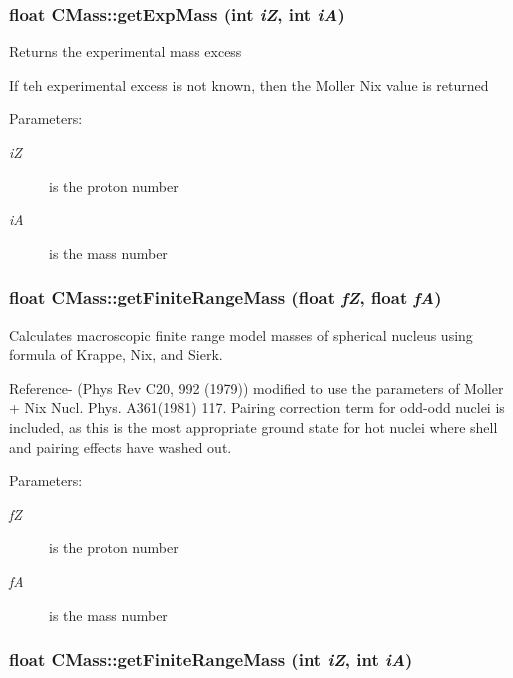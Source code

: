 \subsubsection{\setlength{\rightskip}{0pt plus 5cm}float CMass::get\-Exp\-Mass (int {\em i\-Z}, int {\em i\-A})}\label{classCMass_2431d9c00dc5a3835e14af2c6d61a764}


Returns the experimental mass excess

If teh experimental excess is not known, then the Moller Nix value is returned \begin{Desc}
\item[Parameters:]
\begin{description}
\item[{\em i\-Z}]is the proton number \item[{\em i\-A}]is the mass number \end{description}
\end{Desc}
\subsubsection{\setlength{\rightskip}{0pt plus 5cm}float CMass::get\-Finite\-Range\-Mass (float {\em f\-Z}, float {\em f\-A})}\label{classCMass_ded19b5cce25e6c94596b4e47dad6c84}


Calculates macroscopic finite range model masses of spherical nucleus using formula of Krappe, Nix, and Sierk.

Reference- (Phys Rev C20, 992 (1979)) modified to use the parameters of Moller + Nix Nucl. Phys. A361(1981) 117. Pairing correction term for odd-odd nuclei is included, as this is the most appropriate ground state for hot nuclei where shell and pairing effects have washed out. \begin{Desc}
\item[Parameters:]
\begin{description}
\item[{\em f\-Z}]is the proton number \item[{\em f\-A}]is the mass number \end{description}
\end{Desc}
\subsubsection{\setlength{\rightskip}{0pt plus 5cm}float CMass::get\-Finite\-Range\-Mass (int {\em i\-Z}, int {\em i\-A})}\label{classCMass_e0a6619be4dd82e97a7ba156af853c9e}


